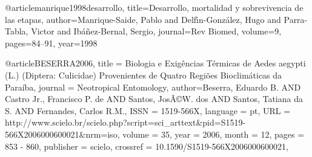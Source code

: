 
@article{manrique1998desarrollo,
  title={Desarrollo, mortalidad y sobrevivencia de las etapas},
  author={Manrique-Saide, Pablo and Delf{\'\i}n-Gonz{\'a}lez, Hugo and Parra-Tabla, Victor and Ib{\'a}{\~n}ez-Bernal, Sergio},
  journal={Rev Biomed},
  volume={9},
  pages={84--91},
  year={1998}
}

@article{BESERRA2006,
   title = {{Biologia e Exigências Térmicas de Aedes aegypti (L.) (Diptera: Culicidae)
Provenientes de Quatro Regiões Bioclimáticas da Paraíba}},
   journal = {{Neotropical Entomology}},
   author={Beserra, Eduardo B. AND Castro Jr., Francisco P. de AND Santos, Jos\~A\copyright W. dos AND Santos, Tatiana da S. AND Fernandes, Carlos R.M.},
   ISSN = {1519-566X},
   language = {pt},
   URL = {http://www.scielo.br/scielo.php?script=sci_arttext&pid=S1519-566X2006000600021&nrm=iso},
   volume = {35},
   year = {2006},
   month = {12},
   pages = {853 - 860},
   publisher = {scielo},
   crossref = {10.1590/S1519-566X2006000600021},
   }
